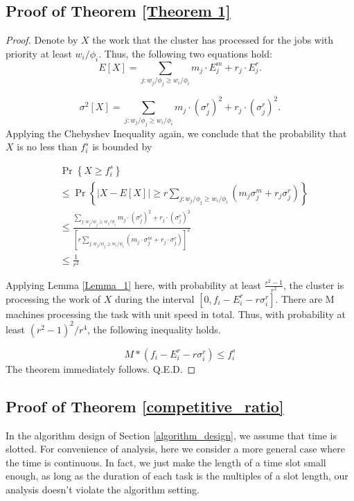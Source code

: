 \documentclass[10pt,conference,compsocconf,letterpaper]{IEEEtran}
\begin{document}
\subsection{Proof of Theorem \ref{Theorem 1}}
\label{proof_theorem_1}
\begin{proof}
Denote by $X$ the work that the cluster has processed for the jobs with priority at least $w_i/\phi_i$. Thus, the following two equations hold:
\begin{equation}
E[X] = \sum_{j:w_j/\phi_j \geq w_i/\phi_i} m_j\cdot E^m_j  + r_j\cdot E^r_j.
\end{equation}

\begin{equation}
\sigma^2[X] = \sum_{j:w_j/\phi_j \geq w_i/\phi_i} m_j\cdot (\sigma^r_j)^2 + r_j\cdot (\sigma^r_j)^2.
\end{equation}
Applying the Chebyshev Inequality again, we conclude that the probability that $X$ is no less than $f_i^s$ is bounded by

\begin{equation}
\begin{split}
& \Pr \left\{X \geq f_i^s \right\} \\ & \leq \Pr \left\{\left|X - E[X]\right| \geq r\sum_{j:w_j/\phi_j \geq w_i/\phi_i}(m_j \sigma^m_j+r_j \sigma^r_j) \right\} \\ & \leq \frac{\sum_{j:w_j/\phi_j \geq w_i/\phi_i} m_j\cdot (\sigma^r_j)^2 + r_j\cdot (\sigma^r_j)^2}{[r\sum_{j:w_j/\phi_j \geq w_i/\phi_i}(m_j\cdot \sigma^m_j+r_j\cdot \sigma^r_j)]^2} \\ & \leq \frac{1}{r^2}
\end{split}
\end{equation}

Applying Lemma \ref{Lemma_1} here, with probability at least $\frac{r^2-1}{r^2}$, the cluster is processing the work of $X$ during the interval $[0,f_i-E^r_i - r\sigma^r_i]$.
There are M machines processing the task with unit speed in total. Thus, with probability at least $(r^2-1)^2/r^4$, the following inequality holds.

\begin{equation}
M*(f_i-E^r_i -r\sigma^r_i) \leq f_i^s
\end{equation}
The theorem immediately follows. Q.E.D.
\end{proof}


\subsection{Proof of Theorem \ref{competitive_ratio}}
\label{proof_a}
In the algorithm design of Section \ref{algorithm_design}, we assume that time is slotted. For convenience of analysis, here we
consider a more general case where the time is continuous. In fact, we just make the length of
a time slot small enough, as long as the duration of each task is the multiples of
a slot length, our analysis doesn't violate the algorithm setting.
\end{document}
